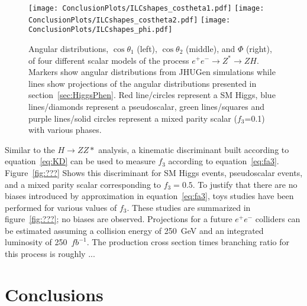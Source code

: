 \begin{figure}
\begin{center}
\texttt{[image: ConclusionPlots/ILCshapes\_costheta1.pdf]}
\texttt{[image: ConclusionPlots/ILCshapes\_costheta2.pdf]}
\texttt{[image: ConclusionPlots/ILCshapes\_phi.pdf]}
\label{fig:ILCprojections}
\caption{Angular distributions, $\cos\theta_1$ (left), 
$\cos\theta_2$ (middle), and $\Phi$ (right), of four different 
scalar models of the process $e^+e^-\to Z^*\to ZH$.  Markers
show angular distributions from JHUGen simulations while
lines show projections of the angular distributions presented
in section~\ref{sec:HiggsPhen}. Red line/circles represent a 
SM Higgs, blue lines/diamonds represent a pseudoscalar, green
lines/squares and purple lines/solid circles represent a 
mixed parity scalar ($f_3$=0.1) with various phases.}
\end{center}
\end{figure}

Similar to the $H\to ZZ*$ 
analysis, a kinematic discriminant built according to
equation~\ref{eq:KD} can be used to measure 
$f_3$ according to equation~\ref{eq:fa3}.  
Figure~\ref{fig:???} Shows this discriminant for SM Higgs
events, pseudoscalar events, and a mixed parity scalar
corresponding to $f_3=0.5$.  To justify that there are no
biases introduced by approximation in equation~\ref{eq:fa3},
toys studies have been performed for various values of 
$f_3$.  These studies are summarized in figure~\ref{fig:???};
no biases are observed.  Projections for a future $e^+e^-$
colliders can be estimated assuming a collision energy  
of 250~GeV and an integrated luminosity of 250~$fb^{-1}$.
The production cross section times branching ratio for 
this process is roughly ...

\section{Conclusions}




